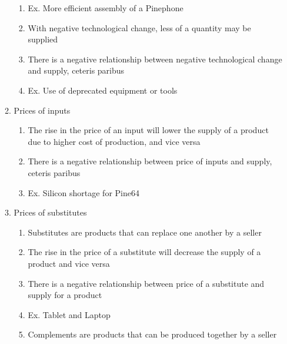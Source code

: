 \documentclass[12pt]{article}
\begin{document}
\begin{enumerate}
\begin{enumerate}
\begin{enumerate}
              \item Ex. More efficient assembly of a Pinephone

              \item With negative technological change, less of a quantity may be supplied

              \item There is a negative relationship between negative technological change and supply, ceteris paribus

              \item Ex. Use of deprecated equipment or tools

            \end{enumerate}

          \item Prices of inputs

            \begin{enumerate}

              \item The rise in the price of an input will lower the supply of a product due to higher cost of production, and vice versa

              \item There is a negative relationship between price of inputs and supply, ceteris paribus

              \item Ex. Silicon shortage for Pine64

            \end{enumerate}

          \item Prices of substitutes

            \begin{enumerate}

              \item Substitutes are products that can replace one another by a seller

              \item The rise in the price of a substitute will decrease the supply of a product and vice versa

              \item There is a negative relationship between price of a substitute and supply for a product

              \item Ex. Tablet and Laptop

              \item Complements are products that can be produced together by a seller


\end{enumerate}
\end{enumerate}
\end{enumerate}
\end{document}
